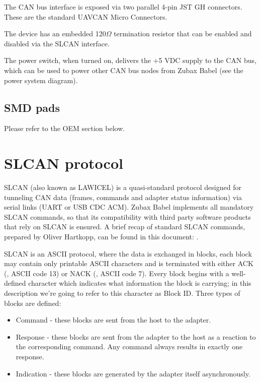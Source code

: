 \documentclass{zubaxdoc}
\begin{document}
The CAN bus interface is exposed via two parallel 4-pin JST GH connectors. These are the standard UAVCAN Micro Connectors.

The device has an embedded 120$\Omega$ termination resistor that can be enabled and disabled via the SLCAN interface.

The power switch, when turned on, delivers the +5 VDC supply to the CAN bus, which can be used to power other CAN bus nodes from Zubax Babel (see the power system diagram).

\section{SMD pads}

Please refer to the OEM section below.

\chapter{SLCAN protocol}

SLCAN (also known as LAWICEL) is a quasi-standard protocol designed for tunneling CAN data (frames, commands and adapter status information) via serial links (UART or USB CDC ACM). Zubax Babel implements all mandatory SLCAN commands, so that its compatibility with third party software products that rely on SLCAN is ensured. A brief recap of standard SLCAN commands, prepared by Oliver Hartkopp, can be found in this document: .

SLCAN is an ASCII protocol, where the data is exchanged in blocks, each block may contain only printable ASCII characters and is terminated with either ACK (, ASCII code 13) or NACK (, ASCII code 7). Every block begins with a well-defined character which indicates what information the block is carrying; in this description we’re going to refer to this character as Block ID. Three types of blocks are defined:

\begin{itemize}
\item Command - these blocks are sent from the host to the adapter.
\item Response - these blocks are sent from the adapter to the host as a reaction to the corresponding command. Any command always results in exactly one response.
\item Indication - these blocks are generated by the adapter itself asynchronously.
\end{itemize}
\end{document}
